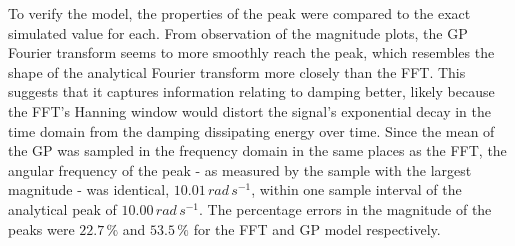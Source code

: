 \documentclass[12pt]{article}
\begin{document}

    To verify the model, the properties of the peak were compared to the exact simulated value for each.
    From observation of the magnitude plots, the GP Fourier transform seems to more smoothly reach the peak, which resembles the shape of the analytical Fourier transform more closely than the FFT.
    This suggests that it captures information relating to damping better, likely because the FFT's Hanning window would distort the signal's exponential decay in the time domain from the damping dissipating energy over time.
    Since the mean of the GP was sampled in the frequency domain in the same places as the FFT, the angular frequency of the peak - as measured by the sample with the largest magnitude - was identical, $10.01 \, rad \, s^{-1}$, within one sample interval of the analytical peak of $10.00 \, rad \, s^{-1}$.
    The percentage errors in the magnitude of the peaks were $22.7 \, \%$ and $53.5 \, \%$ for the FFT and GP model respectively.
\end{document}
